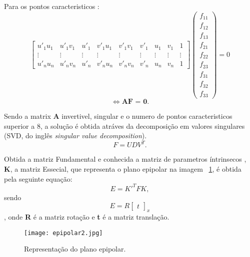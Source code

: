 	Para os pontos caracteristicos : \[  \left[ \begin{array}{ccccccccc }
	u'_{1}u_{1} & u'_{1}v_{1} & u'_{1} & v'_{1}u_{1} & v'_{1}v_{1} & v'_{1} & u_{1} & v_{1} & 1 \\ 
	\vdots  & \vdots  & \vdots  & \vdots  & \vdots  & \vdots  & \vdots  & \vdots  & \vdots \\ 
	u'_nu_n & u'_nv_n & u'_n & v'_nu_n & v'_nv_n & v'_n & u_n & v_n & 1
	\end{array}\right] \left( \begin{array}{ccccccccc}
	f_{11}\\
	f_{12}\\
	f_{13}\\
	f_{21}\\
	f_{22}\\
	f_{23}\\
	f_{31}\\
	f_{32}\\
	f_{33}
	\end{array} \right) = 0 \]  \begin{equation}\label{equ:af=0}
	\Leftrightarrow \textbf{AF = 0}. 
	\end{equation}
	
	Sendo a matrix \textbf{A} invertivel, singular  e o numero de pontos caracteristicos superior a 8, a solução é obtida atráves da decomposição em valores singulares (SVD, do inglês \textit{singular value decomposition}).  \[ F = U D V^{T}.\]
	
		
	Obtida a matriz Fundamental e conhecida a matriz de parametros íntrinsecos , \textbf{K}, a matriz Essecial, que representa o plano epipolar na imagem ~\ref{fig:esseciallinemat}, é obtida pela seguinte equação:
	\[ E = {K}'^{T} F K, \]  sendo \[ E = R \left[\begin{array}{c}
	t
	\end{array}\right]_{x} \], onde \textbf{R} é a matriz rotação e \textbf{t} é a matriz translação.
	
	\begin{figure}[h!] %
		\begin{center}
			\leavevmode		
			\texttt{[image: epipolar2.jpg]}
			\caption{Representação do plano epipolar.}
			\label{fig:esseciallinemat}
		\end{center}
	\end{figure}
	
